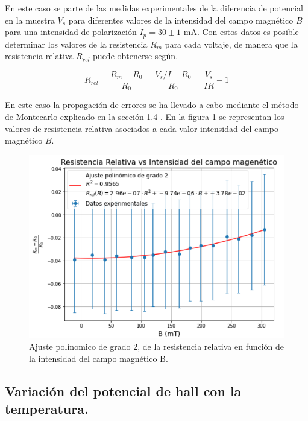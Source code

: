 	En este caso se parte de las medidas experimentales de la diferencia de potencial en la muestra $V_s$ para diferentes valores de la intensidad del campo magnético $B$ para una intensidad de polarización $I_p=30\pm1$ mA. Con estos datos es posible determinar los valores de la resistencia $R_m$ para cada voltaje, de manera que la resistencia relativa $R_{rel}$ puede obtenerse según.
	
	\begin{equation} \label{eq:sigma0}
		R_{rel} =  \frac{R_m - R_0}{R_0} =  \frac{V_s/I - R_0}{R_0} = \frac{V_s}{IR}-1
	\end{equation} 

	En este caso la propagación de errores se ha llevado a cabo mediante el método de Montecarlo explicado en la sección 1.4 \cite{error_prop_1}. En la figura \ref{fig:res_rel} se representan los valores de resistencia relativa asociados a cada valor intensidad del campo magnético $B$.
	
	
	\begin{figure}[H]
		\centering
		\begin{minipage}{0.7\textwidth} 
			\includegraphics[width=\textwidth]{grafico_1x04_resistencia_relativa_B.png}
			\caption{\footnotesize Ajuste polínomico de grado 2, de la resistencia relativa en función de la intensidad del campo magnético B.}
			\label{fig:res_rel}
		\end{minipage}
	\end{figure}
	
	
	\subsection{Variación del potencial de hall con la temperatura.}
	
